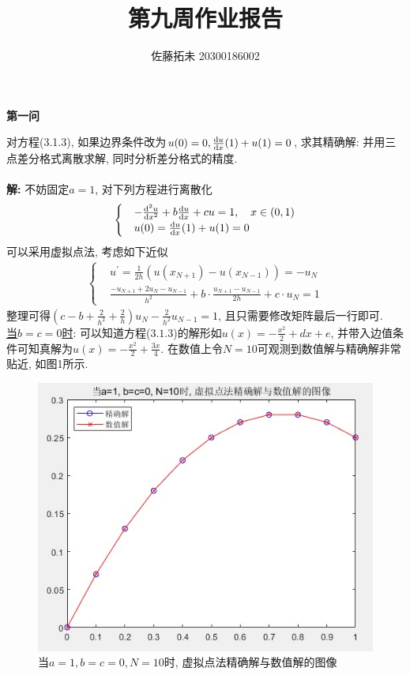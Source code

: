 \documentclass[12pt]{article}
\title{第九周作业报告}
\author{佐藤拓未 20300186002}
\date{}
\begin{document}
	
	\maketitle

\begin{center}
	\textbf{第一问}
\end{center}
\noindent 对方程(3.1.3), 如果边界条件改为$u(0)=0,\frac{{\rm d}u}{{\rm d}x}(1)+u(1)=0$, 求其精确解: 并用三点差分格式离散求解, 同时分析差分格式的精度.\\
\quad \\
\textbf{解:} 不妨固定$a=1$, 对下列方程进行离散化
\begin{align*}
	\begin{cases}
		&-\frac{{\rm d}^2u}{{\rm d}x^2}+b\frac{{\rm d}u}{{\rm d}x}+cu=1,\quad x\in(0,1)\\
		&u(0)=\frac{{\rm d}u}{{\rm d}x}(1)+u(1)=0
	\end{cases}
\end{align*}
\noindent 可以采用虚拟点法, 考虑如下近似
\begin{align*}
	\begin{cases}
		&u^{'}=\frac{1}{2h}(u(x_{N+1})-u(x_{N-1}))=-u_N\\
		&\frac{-u_{N+1}+2u_N-u_{N-1}}{h^2}+b\cdot\frac{u_{N+1}-u_{N-1}}{2h}+c\cdot u_N=1
	\end{cases}
\end{align*}
\noindent 整理可得$(c-b+\frac{2}{h^2}+\frac{2}{h})u_N-\frac{2}{h^2}u_{N-1}=1$, 且只需要修改矩阵最后一行即可.\\
\underline{当$b=c=0$时}: 可以知道方程($3.1.3$)的解形如$u(x)=-\frac{x^2}{2}+dx+e$, 并带入边值条件可知真解为$u(x)=-\frac{x^2}{2}+\frac{3x}{4}$. 在数值上令$N=10$可观测到数值解与精确解非常贴近, 如图1所示.
\begin{figure}[H]
	\centering
	\includegraphics[width=1\textwidth]{13}
	\caption{当$a=1, b=c=0, N=10$时, 虚拟点法精确解与数值解的图像}
\end{figure}
\end{document}
